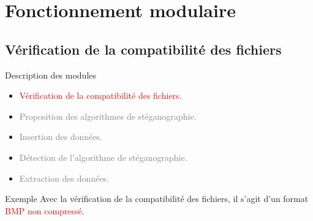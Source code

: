 \documentclass{beamer}
\begin{document}
    \section{Fonctionnement modulaire}
    
    \subsection{Vérification de la compatibilité des fichiers}
    \begin{frame} %
	\begin{block}{Description des modules}
	\begin{itemize}
	[circle]
	\item \textcolor{red}{Vérification de la compatibilité des fichiers.}
	\item \textcolor{gray} {Proposition des algorithmes de stéganographie.}
	\item \textcolor{gray} {Insertion des données.}
	\item \textcolor{gray} {Détection de l'algorithme de stéganographie.}
	\item \textcolor{gray} {Extraction des données.}
	\end{itemize}
	\end{block}
	
	\begin{exampleblock}{Exemple} 
	Avec la vérification de la compatibilité des fichiers, il s'agit d'un 
	format \textcolor{red}{BMP non compressé}.  
	\end{exampleblock}
  \end{frame}
  
\end{document}

